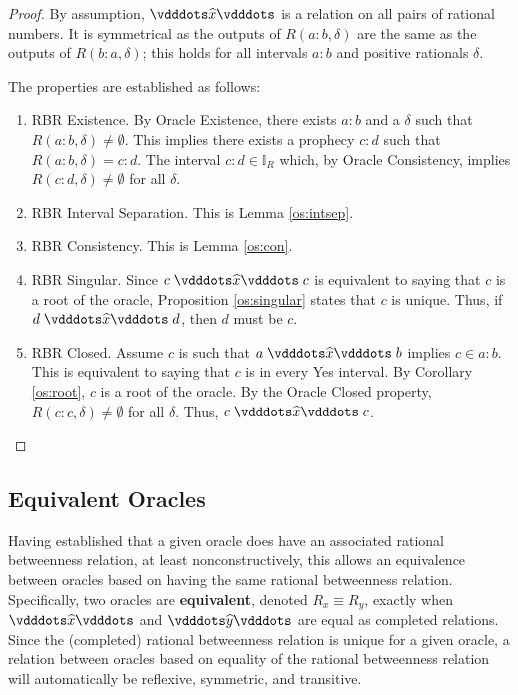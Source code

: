 \documentclass[12pt]{article}
\begin{document}
\begin{proof}
    By assumption, $\xora$ is a relation on all pairs of rational numbers. It is symmetrical as the outputs of $R(a:b, \delta)$ are the same as the outputs of $R(b:a, \delta)$; this holds for all intervals $a:b$ and positive rationals $\delta$.

    The properties are established as follows: 
    \begin{enumerate}
        \item RBR Existence. By Oracle Existence, there exists $a:b$  and a $\delta$ such that $R(a:b, \delta) \neq \emptyset$. This implies there exists a prophecy $c:d$ such that $R(a:b, \delta) = c:d$. The interval $c:d \in \mathbb{I}_R$ which, by Oracle Consistency, implies $R(c:d, \delta) \neq \emptyset$ for all $\delta$.  
        \item RBR Interval Separation. This is Lemma \ref{os:intsep}.
        \item RBR Consistency. This is Lemma \ref{os:con}.
        \item RBR Singular. Since $c \xora c$ is equivalent to saying that $c$ is a root of the oracle, Proposition \ref{os:singular}  states that $c$ is unique. Thus, if $d \xora d$, then $d$ must be $c$. 
        \item RBR Closed. Assume $c$ is such that $a \xora b$ implies $c \in a:b$. This is equivalent to saying that $c$ is in every Yes interval. By Corollary \ref{os:root}, $c$ is a root of the oracle. By the Oracle Closed property, $R(c:c, \delta) \neq \emptyset$ for all $\delta$. Thus, $c \xora c$.
    \end{enumerate}
\end{proof}

\subsection{Equivalent Oracles}

Having established that a given oracle does have an associated rational betweenness relation, at least nonconstructively, this allows an equivalence between oracles based on having the same rational betweenness relation. Specifically, two oracles are \textbf{equivalent}, denoted $R_x \equiv R_y$, exactly when $\xora$ and $\xora[y]$ are equal as completed relations. Since the (completed) rational betweenness relation is unique for a given oracle, a relation between oracles based on equality of the rational betweenness relation will automatically be reflexive, symmetric, and transitive. 
\end{document}

